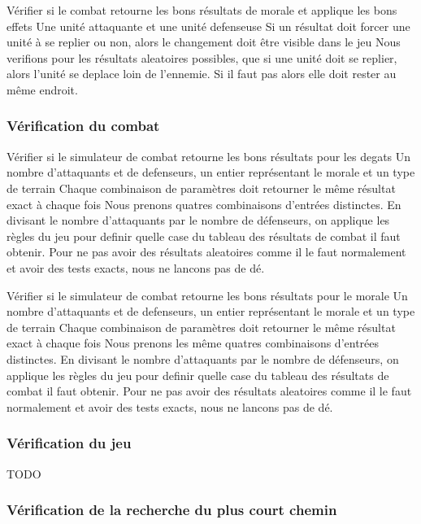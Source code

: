 \mytest
{Vérifier si le combat retourne les bons résultats de morale et applique les bons effets}
{Une unité attaquante et une unité defenseuse}
{Si un résultat doit forcer une unité à se replier ou non, alors le changement doit être visible dans le jeu}
{Nous verifions pour les résultats aleatoires possibles, que si une unité doit se replier, alors l'unité se
deplace loin de l'ennemie. Si il faut pas alors elle doit rester au même endroit.}

\subsubsection{Vérification du combat}

\mytest
{Vérifier si le simulateur de combat retourne les bons résultats pour les degats}
{Un nombre d'attaquants et de defenseurs, un entier représentant le morale et un type de terrain}
{Chaque combinaison de paramètres doit retourner le même résultat exact à chaque fois}
{Nous prenons quatres combinaisons d'entrées distinctes. 
En divisant le nombre d'attaquants par le nombre de défenseurs, on applique les règles du jeu pour definir
quelle case du tableau des résultats de combat il faut obtenir. Pour ne pas avoir des résultats aleatoires comme
il le faut normalement et avoir des tests exacts, nous ne lancons pas de dé.}

\mytest
{Vérifier si le simulateur de combat retourne les bons résultats pour le morale}
{Un nombre d'attaquants et de defenseurs, un entier représentant le morale et un type de terrain}
{Chaque combinaison de paramètres doit retourner le même résultat exact à chaque fois}
{Nous prenons les même quatres combinaisons d'entrées distinctes. 
En divisant le nombre d'attaquants par le nombre de défenseurs, on applique les règles du jeu pour definir
quelle case du tableau des résultats de combat il faut obtenir. Pour ne pas avoir des résultats aleatoires comme
il le faut normalement et avoir des tests exacts, nous ne lancons pas de dé.}


\subsubsection{Vérification du jeu}

TODO

\subsubsection{Vérification de la recherche du plus court chemin}

